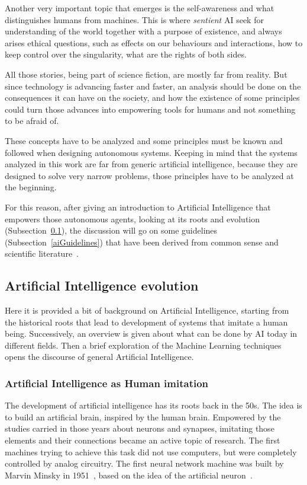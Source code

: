 Another very important topic that emerges is the self-awareness and what distinguishes humans from machines. This is where \textit{sentient} AI seek for understanding of the world together with a purpose of existence, and always arises ethical questions, such as effects on our behaviours and interactions, how to keep control over the singularity, what are the rights of both sides.

All those stories, being part of science fiction, are mostly far from reality. But since technology is advancing faster and faster, an analysis should be done on the consequences it can have on the society, and how the existence of some principles could turn those advances into empowering tools for humans and not something to be afraid of.

These concepts have to be analyzed and some principles must be known and followed when designing autonomous systems. Keeping in mind that the systems analyzed in this work are far from generic artificial intelligence, because they are designed to solve very narrow problems, those principles have to be analyzed at the beginning.

For this reason, after giving an introduction to Artificial Intelligence that empowers those autonomous agents, looking at its roots and evolution (Subsection~\ref{aiEvolution}), the discussion will go on some guidelines (Subsection~\ref{aiGuidelines}) that have been derived from common sense and scientific literature~\cite{walsh2016turing,hibbard2014ethical,moor2009four,clarke2011asimov}.

\subsection{Artificial Intelligence evolution}
\label{aiEvolution}

Here it is provided a bit of background on Artificial Intelligence, starting from the historical roots that lead to development of systems that imitate a human being. Successively, an overview is given about what can be done by AI today in different fields. Then a brief exploration of the Machine Learning techniques opens the discourse of general Artificial Intelligence.

\subsubsection{Artificial Intelligence as Human imitation}
The development of artificial intelligence has its roots back in the 50s. The idea is to build an artificial brain, inspired by the human brain. Empowered by the studies carried in those years about neurons and synapses, imitating those elements and their connections became an active topic of research. The first machines trying to achieve this task did not use computers, but were completely controlled by analog circuitry. The first neural network machine was built by Marvin Minsky in 1951~\cite{minsky1952neural}, based on the idea of the artificial neuron~\cite{mcculloch1943logical,rosenblatt1958perceptron}.


